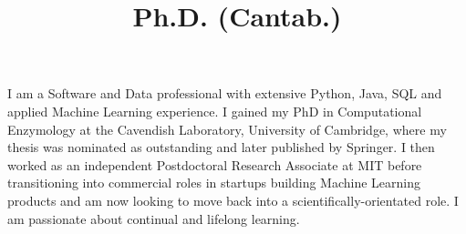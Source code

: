 \documentclass[11pt,a4paper,sans]{moderncv}        %
\title{Ph.D. (Cantab.)}                               %
\begin{document}
\makecvtitle
\vspace*{-1.2cm}
%
I am a Software and Data professional with extensive Python, Java, SQL and applied Machine Learning experience. 
%
I gained my PhD in Computational Enzymology at the Cavendish Laboratory, University of Cambridge, 
where my thesis was nominated as outstanding and later published by Springer.
%
I then worked as an independent Postdoctoral Research Associate at MIT before transitioning into commercial roles in startups building Machine Learning products and am now looking to move back into a scientifically-orientated role.
%
I am passionate about continual and lifelong learning.

\vspace*{-0.5cm}
\end{document}
